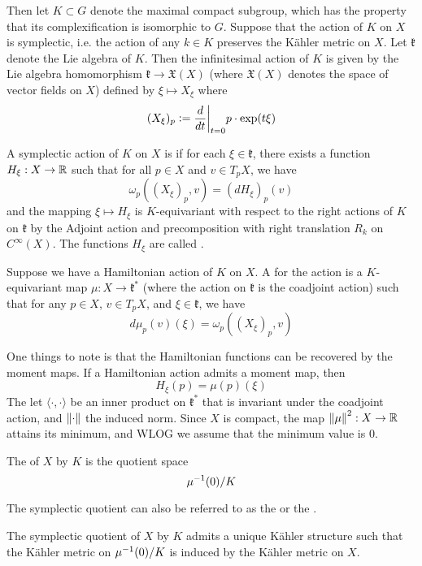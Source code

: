Then let $K \subset G$ denote the maximal compact subgroup, which has the
property that its complexification is isomorphic to $G$. Suppose that
the action of $K$ on $X$ is symplectic, i.e. the action of any $k \in K$
preserves the K\"ahler metric on $X$. Let $\mathfrak{k}$ denote the
Lie algebra of $K$. Then the infinitesimal action of $K$ is given by
the Lie algebra homomorphism $\mathfrak{k} \to \mathfrak{X}(X)$ (where
$\mathfrak{X}(X)$ denotes the space of vector fields on $X$) defined by
$\xi \mapsto X_\xi$ where
\[
(X_\xi)_p \vcentcolon= \frac{d}{dt}\bigg\vert_{t=0}p\cdot \exp(t\xi)
\]
\begin{defn}
A symplectic action of $K$ on $X$ is  if for each
$\xi \in \mathfrak{k}$, there exists a function $H_\xi : X \to \mathbb{R}$
such that for all $p \in X$ and $v \in T_pX$, we have
\[
\omega_p((X_\xi)_p,v) = (dH_\xi)_p(v)
\]
and the mapping $\xi \mapsto H_\xi$ is $K$-equivariant with respect
to the right actions of $K$ on $\mathfrak{k}$ by the Adjoint action
and precomposition with right translation $R_k$ on $C^\infty(X)$. The
functions $H_\xi$ are called .
\end{defn}
%
\begin{defn}
Suppose we have a Hamiltonian action of $K$ on $X$. A 
for the action is a $K$-equivariant map $\mu : X \to \mathfrak{k}^*$ (where the
action on $\mathfrak{k}$ is the coadjoint action) such
that for any $p \in X$, $v \in T_pX$, and $\xi \in \mathfrak{k}$, we have
\[
d\mu_p(v)(\xi) = \omega_p((X_\xi)_p,v)
\]
\end{defn}
%
One things to note is that the Hamiltonian functions can be
recovered by the moment maps. If a Hamiltonian action admits a moment map,
then
\[
H_\xi(p) = \mu(p)(\xi)
\]
The let $\langle\cdot,\cdot\rangle$ be an inner product on $\mathfrak{k}^*$
that is invariant under the coadjoint action, and $\left\lVert\cdot\right\rVert$ the induced
norm. Since $X$ is compact, the map $\left\lVert\mu\right\rVert^2 : X \to \mathbb{R}$ attains
its minimum, and WLOG we assume that the minimum value is $0$.
%
\begin{defn}
The  of $X$ by $K$ is the quotient space
\[
\mu^{-1}(0)/K
\]
\end{defn}
%
The symplectic quotient can also be referred to as the 
or the .
%
\begin{thm}
The symplectic quotient of $X$ by $K$ admits a unique K\"ahler structure
such that the K\"ahler metric on $\mu^{-1}(0)/K$ is induced by the K\"ahler
metric on $X$.
\end{thm}
